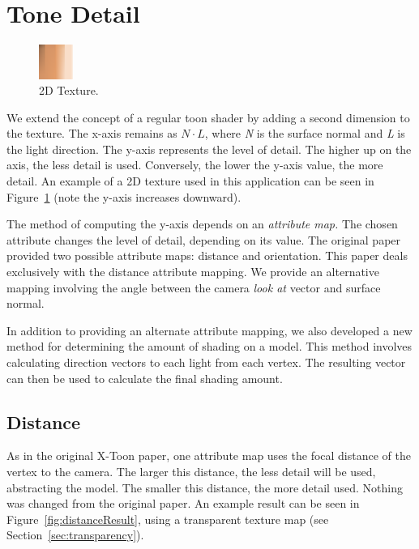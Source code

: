 \documentclass[annual]{acmsiggraph}
\begin{document}
\section{Tone Detail}
\label{sec:tonedetail}
\begin{figure}
  \vspace{-20pt}
  \begin{center}
    \includegraphics[width=0.1\textwidth]{images/xtoon_skin}
  \end{center}
  \caption{2D Texture.}
  \vspace{-10pt}
  \label{fig:2dtexture}
\end{figure}
We extend the concept of a regular toon shader by adding a second dimension to the texture. The x-axis remains as $N\cdot L$, where {\it{N}} is the surface normal and {\it{L}} is the light direction. The y-axis represents the level of detail. The higher up on the axis, the less detail is used. Conversely, the lower the y-axis value, the more detail. An example of a 2D texture used in this application can be seen in Figure~\ref{fig:2dtexture} (note the y-axis increases downward).

The method of computing the y-axis depends on an {\it{attribute map.}} The chosen attribute changes the level of detail, depending on its value. The original paper provided two possible attribute maps: distance and orientation. This paper deals exclusively with the distance attribute mapping. We provide an alternative mapping involving the angle between the camera {\it{look at}} vector and surface normal. 

In addition to providing an alternate attribute mapping, we also developed a new method for determining the amount of shading on a model. This method involves calculating direction vectors to each light from each vertex. The resulting vector can then be used to calculate the final shading amount.

\subsection{Distance}
As in the original X-Toon paper, one attribute map uses the focal distance of the vertex to the camera. The larger this distance, the less detail will be used, abstracting the model. The smaller this distance, the more detail used. Nothing was changed from the original paper. An example result can be seen in Figure~\ref{fig:distanceResult}, using a transparent texture map (see Section~\ref{sec:transparency}).
\end{document}
